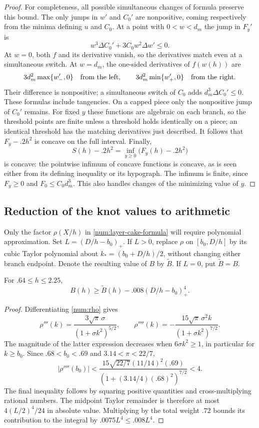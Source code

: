 \begin{proof}
For completeness, all possible simultaneous changes of formula preserve
this bound. The only jumps in $w'$ and $C_0'$ are nonpositive,
coming respectively from the minima defining $u$ and $C_0$.
At a point with $0<w<d_m$ the jump in $F_y'$ is
\[
 w^3\Delta C_0'+3C_0w^2\Delta w'\le0.
\]
At $w=0$, both $f$ and its derivative vanish, so the derivatives
match even at a simultaneous switch. At $w=d_m$, the one-sided
derivatives of $f(w(h))$ are
\[
 3d_m^2\max\{w'_-,0\}\quad\hbox{from the left},\qquad
 3d_m^2\min\{w'_+,0\}\quad\hbox{from the right}.
\]
Their difference is nonpositive; a simultaneous switch of $C_0$
adds $d_m^3\Delta C_0'\le0$. These formulas include tangencies.
On a capped piece only the nonpositive jump of $C_0'$ remains.
For fixed $y$ these functions are algebraic on each branch, so the
threshold points are finite unless a threshold holds identically on a
piece; an identical threshold has the matching derivatives just described.
It follows that $F_y-.2h^2$ is concave on the full interval.
Finally,
\[
 S(h)-.2h^2=\inf_{y\ge0}\bigl(F_y(h)-.2h^2\bigr)
\]
is concave: the pointwise infimum of concave functions is concave,
as is seen either from its defining inequality or its hypograph.
The infimum is finite, since $F_y\ge0$ and $F_0\le C_0d_m^3$.
This also handles changes of the minimizing value of $y$.
\end{proof}

\subsection{Reduction of the knot values to arithmetic}

Only the factor $\rho(X/h)$ in \eqref{num:layer-cake-formula}
will require polynomial approximation. Set
$L=(D/h-b_0)_+$. If $L>0$, replace $\rho$ on $[b_0,D/h]$
by its cubic Taylor polynomial about $k_*=(b_0+D/h)/2$,
without changing either branch endpoint. Denote the resulting value
of $B$ by $\widetilde B$. If $L=0$, put $\widetilde B=B$.

\begin{lemma}\label{num:taylor-error}
For $.64\le h\le2.25$,
\begin{equation}\label{num:taylor-bound}
 B(h)\ge\widetilde B(h)-.008(D/h-b_0)_+^4.
\end{equation}
\end{lemma}

\begin{proof}
Differentiating \eqref{num:rho} gives
\[
 \rho'''(k)=\frac{3\sqrt\pi\,\sigma}{(1+\sigma k^2)^{5/2}},
 \qquad
 \rho''''(k)=-\frac{15\sqrt\pi\,\sigma^2 k}
                         {(1+\sigma k^2)^{7/2}}.
\]
The magnitude of the latter expression decreases when
$6\sigma k^2\ge1$, in particular for $k\ge b_0$.
Since $.68<b_0<.69$ and $3.14<\pi<22/7$,
\[
 |\rho''''(b_0)|
 <\frac{15\sqrt{22/7}(11/14)^2(.69)}
          {(1+(3.14/4)(.68)^2)^{7/2}}<4.
\]
The final inequality follows by squaring positive quantities and
cross-multiplying rational numbers. The midpoint Taylor remainder is
therefore at most $4(L/2)^4/24$ in absolute value. Multiplying
by the total weight $.72$ bounds its contribution to the integral
by $.0075L^4\le.008L^4$.
\end{proof}

